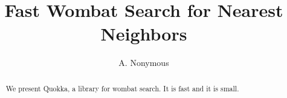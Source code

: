 \documentclass{article}
\begin{document}
\title{Fast Wombat Search for Nearest Neighbors}
\author{A. Nonymous}
\maketitle

\begin{abstract}
We present Quokka, a library for wombat search. It is fast and it is small.
\end{abstract}



\end{document}
